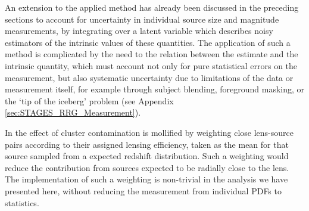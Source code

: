 \documentclass[useAMS,usenatbib,times,letter,amssymb]{mn2e}
\begin{document}
An extension to the applied method has already been discussed in the preceding sections to account for uncertainty in individual source size and magnitude measurements, by integrating over a latent variable which describes noisy estimators of the intrinsic values of  these quantities. The application of such a method is complicated by the need to the relation between the estimate and the intrinsic quantity, which must account not only for pure statistical errors on the measurement, but also systematic uncertainty due to limitations of the data or measurement itself, for example through subject blending, foreground masking, or the `tip of the iceberg' problem (see Appendix \ref{sec:STAGES_RRG_Measurement}).

In \cite{Velander:2010p636} the effect of cluster contamination is mollified by weighting close lens-source pairs according to their assigned lensing efficiency, taken as the mean for that source sampled from a expected redshift distribution. Such a weighting would reduce the contribution from sources expected to be radially close to the lens. The implementation of such a weighting is non-trivial in the analysis we have presented here, without reducing the measurement from individual PDFs to statistics.

\end{document}
